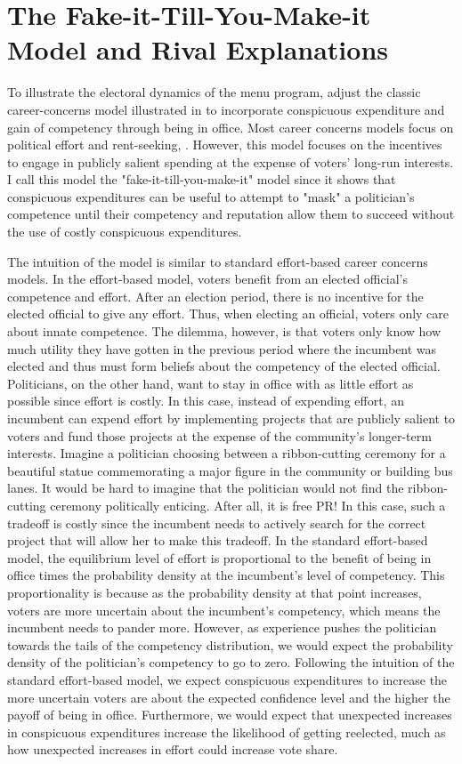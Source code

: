 \section*{The Fake-it-Till-You-Make-it Model and Rival Explanations}
To illustrate the electoral dynamics of the menu program, adjust the classic career-concerns model illustrated in \cite{gehlbach2021formal} to incorporate conspicuous expenditure and gain of competency through being in office. 
Most career concerns models focus on political effort and rent-seeking, \cite{barro_politiciancontrol} \cite{ferrejohn_acct}. 
However, this model focuses on the incentives to engage in publicly salient spending at the expense of voters' long-run interests. 
I call this model the "fake-it-till-you-make-it" model since it shows that conspicuous expenditures can be useful to attempt to "mask" a politician's competence until their competency and reputation allow them to succeed without the use of costly conspicuous expenditures.

The intuition of the model is similar to standard effort-based career concerns models. 
In the effort-based model, voters benefit from an elected official's competence and effort. 
After an election period, there is no incentive for the elected official to give any effort. 
Thus, when electing an official, voters only care about innate competence. The dilemma, however, is that voters only know how much utility they have gotten in the previous period where the incumbent was elected and thus must form beliefs about the competency of the elected official. 
Politicians, on the other hand, want to stay in office with as little effort as possible since effort is costly. 
In this case, instead of expending effort, an incumbent can expend effort by implementing projects that are publicly salient to voters and fund those projects at the expense of the community's longer-term interests. 
Imagine a politician choosing between a ribbon-cutting ceremony for a beautiful statue commemorating a major figure in the community or building bus lanes. 
It would be hard to imagine that the politician would not find the ribbon-cutting ceremony politically enticing. 
After all, it is free PR! In this case, such a tradeoff is costly since the incumbent needs to actively search for the correct project that will allow her to make this tradeoff. 
In the standard effort-based model, the equilibrium level of effort is proportional to the benefit of being in office times the probability density at the incumbent's level of competency. 
This proportionality is because as the probability density at that point increases, voters are more uncertain about the incumbent's competency, which means the incumbent needs to pander more. 
However, as experience pushes the politician towards the tails of the competency distribution, we would expect the probability density of the politician's competency to go to zero. 
Following the intuition of the standard effort-based model, we expect conspicuous expenditures to increase the more uncertain voters are about the expected confidence level and the higher the payoff of being in office. 
Furthermore, we would expect that unexpected increases in conspicuous expenditures increase the likelihood of getting reelected, much as how unexpected increases in effort could increase vote share. 

